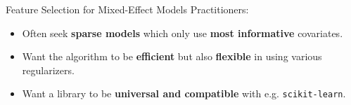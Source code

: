 \documentclass[8pt]{beamer}
\begin{document}
\begin{frame}{Feature Selection for Mixed-Effect Models}
Practitioners:
\begin{itemize}
	\item<1-> Often seek \textbf{sparse models} which only use \textbf{most informative} covariates. 
	\item<2-> Want the algorithm to be \textbf{efficient} but also \textbf{flexible} in using various regularizers.
	\item<3-> Want a library to be \textbf{universal and compatible} with e.g. \texttt{scikit-learn}.
\end{itemize}
\vspace{1em}

\end{frame}
\end{document}
